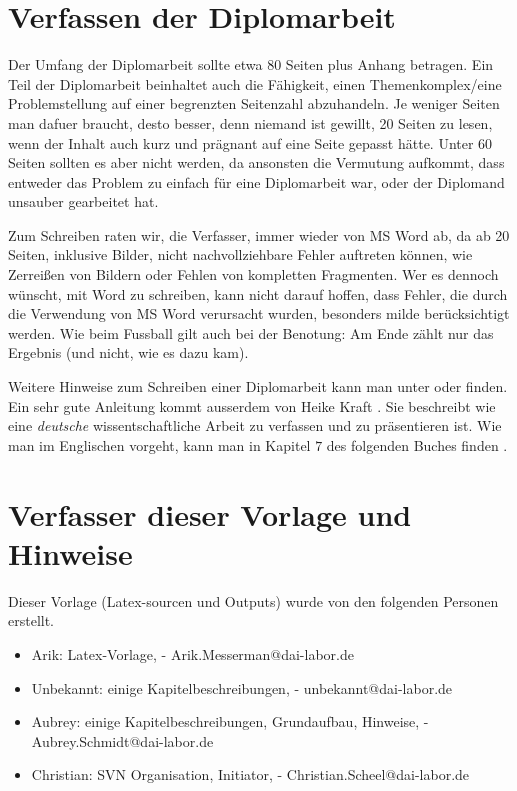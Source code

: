 \section{Verfassen der Diplomarbeit}
Der Umfang der Diplomarbeit sollte etwa 80 Seiten plus Anhang betragen. Ein Teil der Diplomarbeit beinhaltet auch die Fähigkeit, einen Themenkomplex/eine Problemstellung auf einer begrenzten Seitenzahl abzuhandeln. Je weniger Seiten man dafuer braucht, desto besser, denn niemand ist gewillt, 20 Seiten zu lesen, wenn der Inhalt auch kurz und prägnant auf eine Seite gepasst hätte. Unter 60 Seiten sollten es aber nicht werden, da ansonsten die Vermutung aufkommt, dass entweder das Problem zu einfach für eine Diplomarbeit war, oder der Diplomand unsauber gearbeitet hat.

Zum Schreiben raten wir, die Verfasser, immer wieder von MS Word ab, da ab 20 Seiten, inklusive Bilder, nicht nachvollziehbare Fehler auftreten können, wie Zerreißen von Bildern oder Fehlen von kompletten Fragmenten. Wer es dennoch wünscht, mit Word zu schreiben, kann nicht darauf hoffen, dass Fehler, die durch die Verwendung von MS Word verursacht wurden, besonders milde berücksichtigt werden. Wie beim Fussball gilt auch bei der Benotung: Am Ende zählt nur das Ergebnis (und nicht, wie es dazu kam).

Weitere Hinweise zum Schreiben einer Diplomarbeit kann man unter \cite{wiwi07} oder \cite{Boettcher2004} finden. Ein sehr gute Anleitung kommt ausserdem von Heike Kraft \cite{kraft06}. Sie beschreibt wie eine {\em deutsche} wissentschaftliche Arbeit zu verfassen und zu präsentieren ist. Wie man im Englischen vorgeht, kann man in Kapitel $7$ des folgenden Buches finden \cite{schut07}.

\section{Verfasser dieser Vorlage und Hinweise}
Dieser Vorlage (Latex-sourcen und Outputs) wurde von den folgenden Personen erstellt.
\begin{itemize}
\item Arik: Latex-Vorlage, - Arik.Messerman@dai-labor.de 
\item Unbekannt: einige Kapitelbeschreibungen, - unbekannt@dai-labor.de
\item Aubrey: einige Kapitelbeschreibungen, Grundaufbau, Hinweise, - Aubrey.Schmidt@dai-labor.de
\item Christian: SVN Organisation, Initiator, - Christian.Scheel@dai-labor.de
\end{itemize}
